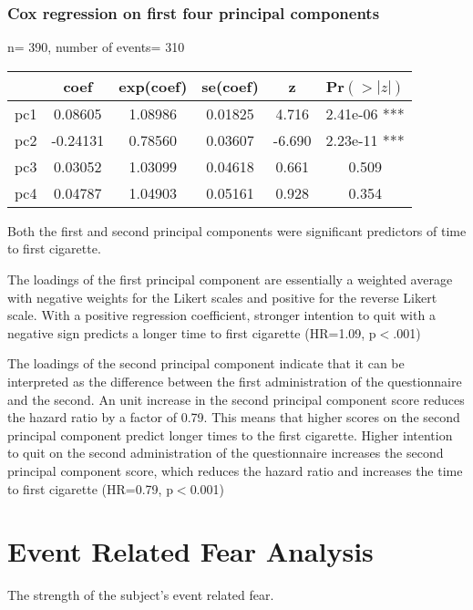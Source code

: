\documentclass[12pt]{article}
\begin{document}
\subsubsection*{Cox regression on first four principal components}

  n= 390, number of events= 310
\par\vspace{0.3 cm}
\begin{tabular}{cccccc}
    &     coef & exp(coef) &  se(coef) & z   & Pr$(>|z|)$\\
\hline  
pc1&  0.08605&   1.08986&  0.01825&  4.716& 2.41e-06 ***\\
pc2& -0.24131&   0.78560&  0.03607& -6.690& 2.23e-11 ***\\
pc3&  0.03052&   1.03099&  0.04618&  0.661&    0.509\\
pc4&  0.04787&   1.04903&  0.05161&  0.928&    0.354 
\end{tabular}
\par\vspace{0.3 cm}
Both the first and second principal components were significant predictors of time to first cigarette.
\par\vspace{0.3 cm}
The loadings of the first principal component are essentially a weighted average with negative weights for the Likert scales and positive for the reverse Likert scale.  With a positive regression coefficient, stronger intention to quit with a negative sign predicts a longer time to first cigarette (HR=1.09, p$<$.001)
\par\vspace{0.3 cm}
The loadings of the second principal component indicate that it can be interpreted as the difference between the first administration of the questionnaire and the second.  An unit increase in the second principal component score reduces the hazard ratio by a factor of 0.79.  This means that higher scores on the second principal component predict longer times to the first cigarette.  Higher intention to quit on the second administration of the questionnaire increases the second principal component score, which reduces the hazard ratio and increases the time to first cigarette (HR=0.79, p$<$0.001)


\section*{Event Related Fear Analysis}
\par\vspace{0.3 cm}
The strength of the subject's event related fear.  
\par\vspace{0.3 cm}
\end{document}
